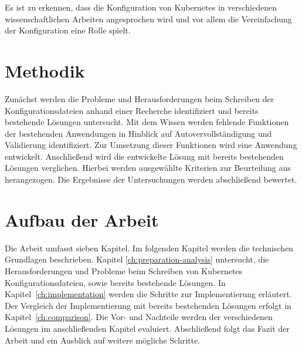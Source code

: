 Es ist zu erkennen, dass die Konfiguration von Kubernetes in verschiedenen wissenschaftlichen Arbeiten angesprochen wird und vor allem die Vereinfachung
der Konfiguration eine Rolle spielt.

\section{Methodik}
Zunächst werden die Probleme und Herausforderungen beim Schreiben der Konfigurationsdateien anhand einer Recherche identifiziert und 
bereits bestehende Lösungen untersucht. Mit dem Wissen werden fehlende Funktionen der bestehenden Anwendungen in Hinblick auf Autovervollständigung und Validierung identifiziert.
Zur Umsetzung dieser Funktionen wird eine Anwendung entwickelt. 
Anschließend wird die entwickelte Lösung mit bereits bestehenden Lösungen verglichen.
Hierbei werden ausgewählte Kriterien zur Beurteilung aus~\cite[A Large-Scale Study of Usability Criteria Addressed by Static Analysis Tools]{usability-criteria-static-analysis-tools} herangezogen.
Die Ergebnisse der Untersuchungen werden abschließend bewertet.

\section{Aufbau der Arbeit}
Die Arbeit umfasst sieben Kapitel.
Im folgenden Kapitel werden die technischen Grundlagen beschrieben. 
Kapitel \ref{ch:preparation-analysis} untersucht, die Herausforderungen und Probleme beim Schreiben von Kubernetes Konfigurationsdateien, sowie bereits bestehende Lösungen.
In Kapitel~\ref{ch:implementation} werden die Schritte zur Implementierung erläutert.
Der Vergleich der Implementierung mit bereits bestehenden Lösungen erfolgt in Kapitel~\ref{ch:comparison}.
Die Vor- und Nachteile werden der verschiedenen Lösungen im anschließenden Kapitel evaluiert.
Abschließend folgt das Fazit der Arbeit und ein Ausblick auf weitere mögliche Schritte.
